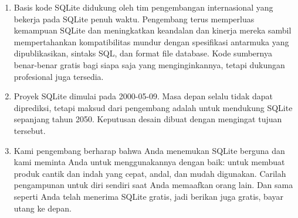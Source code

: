 \begin{enumerate}
				\item Basis kode SQLite didukung oleh tim pengembangan internasional yang bekerja pada SQLite penuh waktu. Pengembang terus memperluas kemampuan SQLite dan meningkatkan keandalan dan kinerja mereka sambil mempertahankan kompatibilitas mundur dengan spesifikasi antarmuka yang dipublikasikan, sintaks SQL, dan format file database. Kode sumbernya benar-benar gratis bagi siapa saja yang menginginkannya, tetapi dukungan profesional juga tersedia.
				\item Proyek SQLite dimulai pada 2000-05-09. Masa depan selalu tidak dapat diprediksi, tetapi maksud dari pengembang adalah untuk mendukung SQLite sepanjang tahun 2050. Keputusan desain dibuat dengan mengingat tujuan tersebut.
				\item Kami pengembang berharap bahwa Anda menemukan SQLite berguna dan kami meminta Anda untuk menggunakannya dengan baik: untuk membuat produk cantik dan indah yang cepat, andal, dan mudah digunakan. Carilah pengampunan untuk diri sendiri saat Anda memaafkan orang lain. Dan sama seperti Anda telah menerima SQLite gratis, jadi berikan juga gratis, bayar utang ke depan.
			\end{enumerate}
			
\cite{owens2010sqlite}
\cite{newman2004sqlite}
\cite{kreibich2010using}
\cite{kang2013x}
\cite{jeon2012recovery}
\cite{lee2012creating}
			
			
